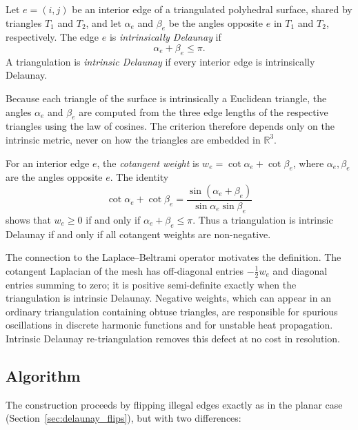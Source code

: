 \begin{definition}\label{def:intrinsic_delaunay_edge}
Let $e = (i,j)$ be an interior edge of a triangulated polyhedral surface, shared by triangles $T_1$ and $T_2$, and let $\alpha_e$ and $\beta_e$ be the angles opposite $e$ in $T_1$ and $T_2$, respectively. The edge $e$ is \emph{intrinsically Delaunay} if
\[
\alpha_e + \beta_e \le \pi.
\]
A triangulation is \emph{intrinsic Delaunay} if every interior edge is intrinsically Delaunay.
\end{definition}

Because each triangle of the surface is intrinsically a Euclidean triangle, the angles $\alpha_e$ and $\beta_e$ are computed from the three edge lengths of the respective triangles using the law of cosines. The criterion therefore depends only on the intrinsic metric, never on how the triangles are embedded in $\mathbb{R}^3$.

\begin{definition}\label{def:cotangent_weight}
For an interior edge $e$, the \emph{cotangent weight} is $w_e = \cot \alpha_e + \cot \beta_e$, where $\alpha_e, \beta_e$ are the angles opposite $e$. The identity
\[
\cot \alpha_e + \cot \beta_e = \frac{\sin(\alpha_e + \beta_e)}{\sin \alpha_e \sin \beta_e}
\]
shows that $w_e \ge 0$ if and only if $\alpha_e + \beta_e \le \pi$. Thus a triangulation is intrinsic Delaunay if and only if all cotangent weights are non-negative.
\end{definition}

The connection to the Laplace--Beltrami operator motivates the definition. The cotangent Laplacian of the mesh has off-diagonal entries $-\tfrac{1}{2} w_e$ and diagonal entries summing to zero; it is positive semi-definite exactly when the triangulation is intrinsic Delaunay. Negative weights, which can appear in an ordinary triangulation containing obtuse triangles, are responsible for spurious oscillations in discrete harmonic functions and for unstable heat propagation. Intrinsic Delaunay re-triangulation removes this defect at no cost in resolution.

\subsection{Algorithm}

The construction proceeds by flipping illegal edges exactly as in the planar case (Section~\ref{sec:delaunay_flips}), but with two differences:

